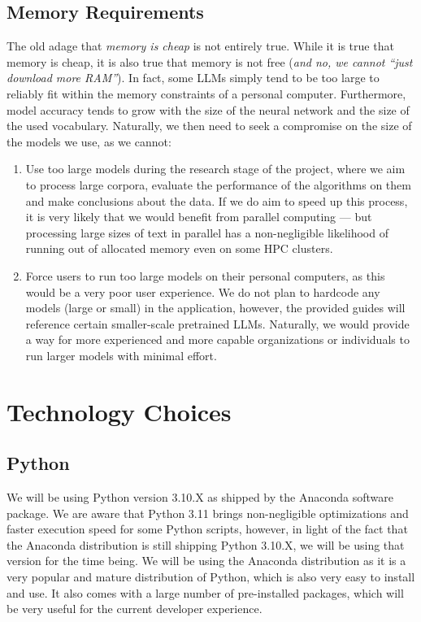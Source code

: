 \subsection{Memory Requirements}
The old adage that \textit{memory is cheap} is not entirely true. While it is true that memory is cheap, it is also true that memory is not free (\textit{and no, we cannot ``just download more RAM''}). In fact, some LLMs simply tend to be too large to reliably fit within the memory constraints of a personal computer.  Furthermore, model accuracy tends to grow with the size of the neural network and the size of the used vocabulary. Naturally, we then need to seek a compromise on the size of the models we use, as we cannot:
\begin{enumerate}
    \item Use too large models during the research stage of the project, where we aim to process large corpora, evaluate the performance of the algorithms on them and make conclusions about the data. If we do aim to speed up this process, it is very likely that we would benefit from parallel computing --- but processing large sizes of text in parallel has a non-negligible likelihood of running out of allocated memory even on some HPC clusters.
    \item Force users to run too large models on their personal computers, as this would be a very poor user experience. We do not plan to hardcode any models (large or small) in the application, however, the provided guides will reference certain smaller-scale pretrained LLMs. Naturally, we would provide a way for more experienced and more capable organizations or individuals to run larger models with minimal effort. 
\end{enumerate} 

\section{Technology Choices}
\subsection{Python}
We will be using Python version 3.10.X as shipped by the Anaconda software package. We are aware that Python 3.11 brings non-negligible optimizations and faster execution speed for some Python scripts, however, in light of the fact that the Anaconda distribution is still shipping Python 3.10.X, we will be using that version for the time being. We will be using the Anaconda distribution as it is a very popular and mature distribution of Python, which is also very easy to install and use. It also comes with a large number of pre-installed packages, which will be very useful for the current developer experience.



